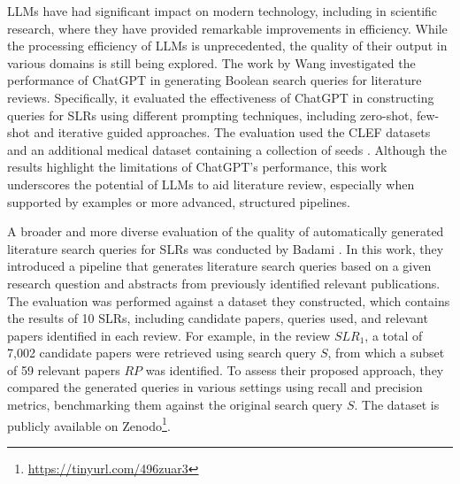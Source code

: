 LLMs have had significant impact on modern technology, including in scientific research, where they have provided remarkable improvements in efficiency. While the processing efficiency of LLMs is unprecedented, the quality of their output in various domains is still being explored. The work by Wang \autocite{wang2023can} investigated the performance of ChatGPT in generating Boolean search queries for literature reviews. Specifically, it evaluated the effectiveness of ChatGPT in constructing queries for SLRs using different prompting techniques, including zero-shot, few-shot and iterative guided approaches. The evaluation used the CLEF datasets \autocite{kanoulas2017clef, kanoulas2018clef, kanoulas2019clef} and an additional medical dataset containing a collection of seeds \autocite{Wang_2022}. Although the results highlight the limitations of ChatGPT's performance, this work underscores the potential of LLMs to aid literature review, especially when supported by examples or more advanced, structured pipelines.

A broader and more diverse evaluation of the quality of automatically generated literature search queries for SLRs was conducted by Badami \autocite{badami2023adaptive}. In this work, they introduced a pipeline that generates literature search queries based on a given research question and abstracts from previously identified relevant publications. The evaluation was performed against a dataset they constructed, which contains the results of 10 SLRs, including candidate papers, queries used, and relevant papers identified in each review. For example, in the review $SLR_1$, a total of 7,002 candidate papers were retrieved using search query $S$, from which a subset of 59 relevant papers $RP$ was identified. To assess their proposed approach, they compared the generated queries in various settings using recall and precision metrics, benchmarking them against the original search query $S$. The dataset is publicly available on Zenodo\footnote{\url{https://tinyurl.com/496zuar3}}.
